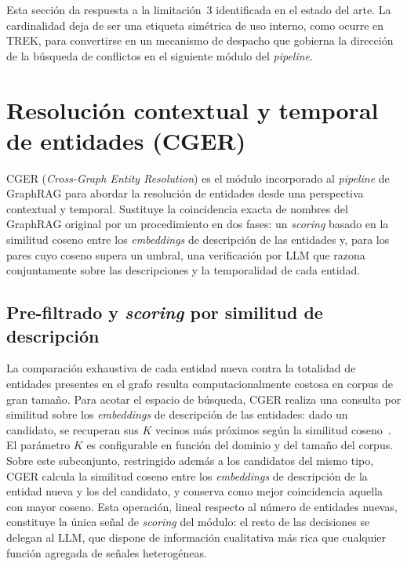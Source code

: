 Esta sección da respuesta a la limitación~3 identificada en el estado del arte. La cardinalidad deja de ser una etiqueta simétrica de uso interno, como ocurre en TREK, para convertirse en un mecanismo de despacho que gobierna la dirección de la búsqueda de conflictos en el siguiente módulo del \emph{pipeline}.

\section{Resolución contextual y temporal de entidades (CGER)}\label{sec:bt-cger}

CGER (\emph{Cross-Graph Entity Resolution}) es el módulo incorporado al \emph{pipeline} de GraphRAG para abordar la resolución de entidades desde una perspectiva contextual y temporal. Sustituye la coincidencia exacta de nombres del GraphRAG original por un procedimiento en dos fases: un \emph{scoring} basado en la similitud coseno entre los \emph{embeddings} de descripción de las entidades y, para los pares cuyo coseno supera un umbral, una verificación por LLM que razona conjuntamente sobre las descripciones y la temporalidad de cada entidad.

\subsection{Pre-filtrado y \emph{scoring} por similitud de descripción}

La comparación exhaustiva de cada entidad nueva contra la totalidad de entidades presentes en el grafo resulta computacionalmente costosa en corpus de gran tamaño. Para acotar el espacio de búsqueda, CGER realiza una consulta por similitud sobre los \emph{embeddings} de descripción de las entidades: dado un candidato, se recuperan sus $K$ vecinos más próximos según la similitud coseno~\cite{TODO_cosine_similarity}. El parámetro $K$ es configurable en función del dominio y del tamaño del corpus. Sobre este subconjunto, restringido además a los candidatos del mismo tipo, CGER calcula la similitud coseno entre los \emph{embeddings} de descripción de la entidad nueva y los del candidato, y conserva como mejor coincidencia aquella con mayor coseno. Esta operación, lineal respecto al número de entidades nuevas, constituye la única señal de \emph{scoring} del módulo: el resto de las decisiones se delegan al LLM, que dispone de información cualitativa más rica que cualquier función agregada de señales heterogéneas.

